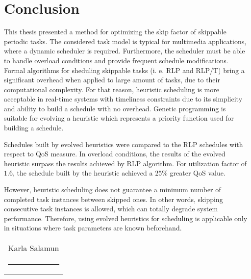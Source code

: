 \chapter{Conclusion}
This thesis presented a method for optimizing the skip factor of skippable periodic tasks.
The considered task model is typical for multimedia applications, where a dynamic scheduler is required.
Furthermore, the scheduler must be able to handle overload conditions and provide frequent schedule modifications.
Formal algorithms for sheduling skippable tasks (i. e. RLP and RLP/T) bring a significant overhead when applied to large amount of tasks, due to their computational complexity.
For that reason, heuristic scheduling is more acceptable in real-time systems with timeliness constraints due to its simplicity and ability to build a schedule with no overhead.
Genetic programming is suitable for evolving a heuristic which represents a priority function used for building a schedule.

Schedules built by evolved heuristics were compared to the RLP schedules with respect to QoS measure.
In overload conditions, the results of the evolved heuristic surpass the results achieved by RLP algorithm.
For utilization factor of $1.6$, the schedule built by the heuristic achieved a $25\%$ greater QoS value.

However, heuristic scheduling does not guarantee a minimum number of completed task instances between skipped ones.
In other words, skipping consecutive task instances is allowed, which can totally degrade system performance.
Therefore, using evolved heuristics for scheduling is applicable only in situations where task parameters are known beforehand.

\newcommand{\namesigdate}[2][5cm]{%
  \begin{tabular}{@{}p{#1}@{}}
    #2 \\[2\normalbaselineskip] \hrule \\[15pt]
  \end{tabular}}

\vspace*{\fill} \noindent \hfill \namesigdate{Karla Salamun}